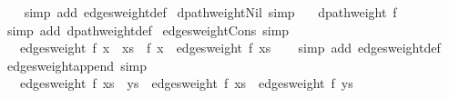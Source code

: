 \begin{isabellebody}
%
\isadelimproof
\ \ %
\endisadelimproof
%
\isatagproof
{}\isamarkupfalse%
\ {\isacharparenleft}{\kern0pt}simp\ add{\isacharcolon}{\kern0pt}\ edges{\isacharunderscore}{\kern0pt}weight{\isacharunderscore}{\kern0pt}def{\isacharparenright}{\kern0pt}%
\endisatagproof
{\isafoldproof}%
%
\isadelimproof
\isanewline
%
\endisadelimproof
\isanewline
{}\isamarkupfalse%
\ dpath{\isacharunderscore}{\kern0pt}weight{\isacharunderscore}{\kern0pt}Nil\ {\isacharbrackleft}{\kern0pt}simp{\isacharbrackright}{\kern0pt}{\isacharcolon}{\kern0pt}\isanewline
\ \ \ {\isachardoublequoteopen}dpath{\isacharunderscore}{\kern0pt}weight\ f\ {\isacharbrackleft}{\kern0pt}{\isacharbrackright}{\kern0pt}\ {\isacharequal}{\kern0pt}\ {}{\isachardoublequoteclose}\isanewline
%
\isadelimproof
\ \ %
\endisadelimproof
%
\isatagproof
{}\isamarkupfalse%
\ {\isacharparenleft}{\kern0pt}simp\ add{\isacharcolon}{\kern0pt}\ dpath{\isacharunderscore}{\kern0pt}weight{\isacharunderscore}{\kern0pt}def{\isacharparenright}{\kern0pt}%
\endisatagproof
{\isafoldproof}%
%
\isadelimproof
\isanewline
%
\endisadelimproof
\isanewline
{}\isamarkupfalse%
\ edges{\isacharunderscore}{\kern0pt}weight{\isacharunderscore}{\kern0pt}Cons\ {\isacharbrackleft}{\kern0pt}simp{\isacharbrackright}{\kern0pt}{\isacharcolon}{\kern0pt}\isanewline
\ \ \ {\isachardoublequoteopen}edges{\isacharunderscore}{\kern0pt}weight\ f\ {\isacharparenleft}{\kern0pt}x\ {\isacharhash}{\kern0pt}\ xs{\isacharparenright}{\kern0pt}\ {\isacharequal}{\kern0pt}\ f\ x\ {\isacharplus}{\kern0pt}\ edges{\isacharunderscore}{\kern0pt}weight\ f\ xs{\isachardoublequoteclose}\isanewline
%
\isadelimproof
\ \ %
\endisadelimproof
%
\isatagproof
{}\isamarkupfalse%
\ {\isacharparenleft}{\kern0pt}simp\ add{\isacharcolon}{\kern0pt}\ edges{\isacharunderscore}{\kern0pt}weight{\isacharunderscore}{\kern0pt}def{\isacharparenright}{\kern0pt}%
\endisatagproof
{\isafoldproof}%
%
\isadelimproof
\isanewline
%
\endisadelimproof
\isanewline
{}\isamarkupfalse%
\ edges{\isacharunderscore}{\kern0pt}weight{\isacharunderscore}{\kern0pt}append\ {\isacharbrackleft}{\kern0pt}simp{\isacharbrackright}{\kern0pt}{\isacharcolon}{\kern0pt}\isanewline
\ \ \ {\isachardoublequoteopen}edges{\isacharunderscore}{\kern0pt}weight\ f\ {\isacharparenleft}{\kern0pt}xs\ {\isacharat}{\kern0pt}\ ys{\isacharparenright}{\kern0pt}\ {\isacharequal}{\kern0pt}\ edges{\isacharunderscore}{\kern0pt}weight\ f\ xs\ {\isacharplus}{\kern0pt}\ edges{\isacharunderscore}{\kern0pt}weight\ f\ ys{\isachardoublequoteclose}\isanewline

\end{isabellebody}
